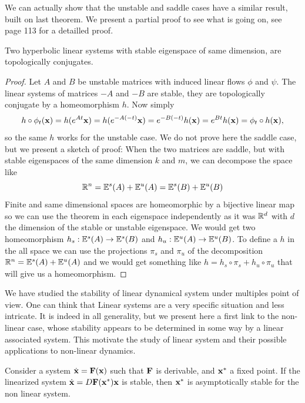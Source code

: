 We can actually show that the unstable and saddle cases have a similar result, built on last theorem. We present a partial proof to see what is going on, see \cite{Rob} page 113 for a detailled proof. 
\begin{corollaire}
    Two hyperbolic linear systems with stable eigenspace of same dimension, are topologically conjugates.
\end{corollaire}
\begin{proof}
    Let $A$ and $B$ be unstable matrices with induced linear flows $\phi$ and $\psi$. The linear systems of matrices $-A$ and $-B$ are stable, they are topologically conjugate by a homeomorphism $h$. Now simply $$h\circ\phi_t(\mathbf{x}) 
    = h(e^{At}\mathbf{x}) 
    = h(e^{-A(-t)}\mathbf{x}) 
    = e^{-B(-t)}h(\mathbf{x})
    = e^{Bt}h(\mathbf{x})
    = \phi_t\circ h(\mathbf{x})
    ,$$
    so the same $h$ works for the unstable case. We do not prove here the saddle case, but we present a sketch of proof:
    When the two matrices are saddle, but with stable eigenspaces of the same dimension $k$ and $m$, we can decompose the space like
    $$\mathbb{R}^n
    = \mathbb{E}^s(A)+\mathbb{E}^u(A) 
    =\mathbb{E}^s(B)+\mathbb{E}^u(B)$$
    Finite and same dimensional spaces are homeomorphic by a bijective linear map so we can use the theorem in each eigenspace independently as it was $\mathbb{R}^d$ with $d$ the dimension of the stable or unstable eigenspace. We would get two homeomorphism $h_s:\mathbb{E}^s(A)\to\mathbb{E}^s(B)$ and $h_u:\mathbb{E}^u(A)\to\mathbb{E}^u(B)$. To define a $h$ in the all space we can use the projections $\pi_s$ and $\pi_u$ of the decomposition $\mathbb{R}^n
    = \mathbb{E}^s(A)+\mathbb{E}^u(A)$  and we would get something like $h = h_s\circ\pi_s + h_u\circ\pi_u$ that will give us a homeomorphism.
\end{proof}
We have studied the stability of linear dynamical system under multiples point of view. One can think that Linear systems are a very specific situation and less intricate. It is indeed in all generality, but we present here a first link to the non-linear case, whose stability appears to be determined in some way by a linear associated system. This motivate the study of linear system and their possible applications to non-linear dynamics.
\begin{theoreme} \label{th:linearisation}
    Consider a system $\dot{\mathbf{x}}=\mathbf{F}(\mathbf{x})$ such that $\mathbf{F}$ is derivable, and $\mathbf{x}^*$ a fixed point. If the linearized system $\dot{\mathbf{x}}=D\mathbf{F}(\mathbf{x}^*)\mathbf{x}$ is stable, then $\mathbf{x}^*$ is asymptotically stable for the non linear system.
\end{theoreme}
